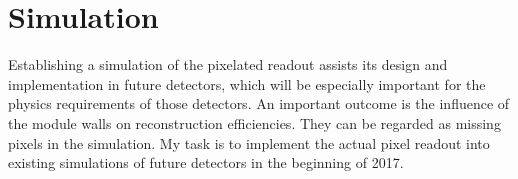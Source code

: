 \section{Simulation\label{sec:rd-dune-nd_simulation}}
Establishing a simulation of the pixelated readout assists its design and implementation in future detectors, which will be especially important for the physics requirements of those detectors.
An important outcome is the influence of the module walls on reconstruction efficiencies.
They can be regarded as missing pixels in the simulation.
My task is to implement the actual pixel readout into existing simulations of future detectors in the beginning of 2017.
